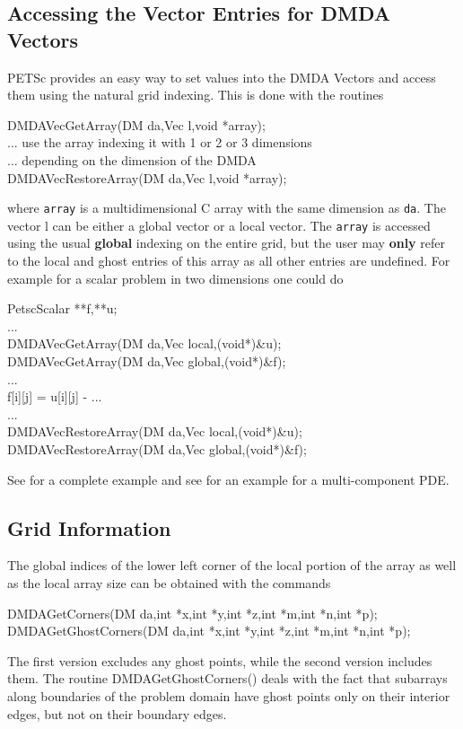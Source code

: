 \subsection{Accessing the Vector Entries for DMDA Vectors}
PETSc provides an easy way to set values into the DMDA Vectors and access them using
the natural grid indexing. This is done with the routines 
\begin{tabbing}
  DMDAVecGetArray(DM da,Vec l,void *array);\\
   ... use the array indexing it with 1 or 2 or 3 dimensions \\
   ... depending on the dimension of the DMDA\\
  DMDAVecRestoreArray(DM da,Vec l,void *array);
\end{tabbing}
where {\tt array} is a multidimensional C array with the same dimension as
{\tt da}. The vector l can be either a global vector or a local vector.
The {\tt array} is accessed using the usual {\bf global} indexing
on the entire grid, but the user may {\bf only} refer to the local and ghost
entries of this array as all other entries are undefined. For example for a
scalar problem in two dimensions one could do
\begin{tabbing}
   PetscScalar **f,**u;\\
   ...\\
  DMDAVecGetArray(DM da,Vec local,(void*)\&u);\\
  DMDAVecGetArray(DM da,Vec global,(void*)\&f);\\
   ...\\
      f[i][j] = u[i][j] - ...\\
   ...\\
  DMDAVecRestoreArray(DM da,Vec local,(void*)\&u);\\
  DMDAVecRestoreArray(DM da,Vec global,(void*)\&f);
\end{tabbing}
See  for a 
complete example and see  for an
example for a multi-component PDE.

\subsection{Grid Information}

The global indices of the lower left corner of the local portion of the array 
as well as the local array size can be obtained with the commands
\begin{tabbing}
  DMDAGetCorners(DM da,int *x,int *y,int *z,int *m,int *n,int *p);\\
  DMDAGetGhostCorners(DM da,int *x,int *y,int *z,int *m,int *n,int *p);
\end{tabbing}
The first version excludes any ghost points, while the second version
includes them. 
The routine DMDAGetGhostCorners()
deals with the fact that subarrays along boundaries of the problem
domain have ghost points only on their interior edges, but not on
their boundary edges.

